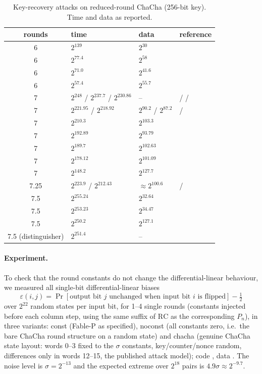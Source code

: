 \documentclass{iacrtrans}
\newcommand{\FableP}{\textsf{Fable-P}\xspace}
\newcommand{\ChaCha}{\textsf{ChaCha}\xspace}
\newcommand{\PP}[1]{P_{#1}}
\begin{document}
\begin{table}[htb]
\centering
\caption{Key-recovery attacks on reduced-round ChaCha (256-bit key). Time and data as reported.}
\label{tab:dllit}
\footnotesize
\begin{tabular}{clll}
\toprule
rounds & time & data & reference\\
\midrule
6 & $2^{139}$ & $2^{30}$ & \cite{AFKMR08}\\
6 & $2^{77.4}$ & $2^{58}$ & \cite{BLT20,BBCDFLNT22}\\
6 & $2^{71.0}$ & $2^{41.6}$ & \cite{Dey24}\\
6 & $2^{57.4}$ & $2^{55.7}$ & \cite{FT25}\\
7 & $2^{248}$ / $2^{237.7}$ / $2^{230.86}$ & -- & \cite{AFKMR08} / \cite{CM16} / \cite{BLT20}\\
7 & $2^{221.95}$ / $2^{218.92}$ & $2^{90.2}$ / $2^{87.2}$ & \cite{DGSS22} / \cite{DGSS23}\\
7 & $2^{210.3}$ & $2^{103.3}$ & \cite{WLHL23}\\
7 & $2^{192.89}$ & $2^{93.79}$ & \cite{Dey24}\\
7 & $2^{189.7}$ & $2^{102.63}$ & \cite{XXTQ24}\\
7 & $2^{178.12}$ & $2^{101.09}$ & \cite{SDSM25}\\
7 & $2^{148.2}$ & $2^{127.7}$ & \cite{FT25}\\
7.25 & $2^{223.9}$ / $2^{212.43}$ & $\approx 2^{100.6}$ & \cite{XXTQ24} / \cite{SDSM25}\\
7.5 & $2^{255.24}$ & $2^{32.64}$ & \cite{Dey24}\\
7.5 & $2^{253.23}$ & $2^{34.47}$ & \cite{SDSM25}\\
7.5 & $2^{250.2}$ & $2^{127.1}$ & \cite{FT25}\\
7.5 (distinguisher) & $2^{251.4}$ & -- & \cite{FT25b}\\
\bottomrule
\end{tabular}
\end{table}

\paragraph{Experiment.} To check that the round constants do not change the differential-linear behaviour, we measured all single-bit differential-linear biases
\[
\varepsilon(i,j) = \Pr[\text{output bit } j \text{ unchanged when input bit } i \text{ is flipped}] - \tfrac12
\]
over $2^{22}$ random states per input bit, for 1--4 single rounds (constants injected before each column step, using the same suffix of $\mathrm{RC}$ as the corresponding $\PP{n}$), in three variants: \textsf{const} (\FableP as specified), \textsf{noconst} (all constants zero, i.e.\ the bare \ChaCha round structure on a random state) and \textsf{chacha} (genuine \ChaCha state layout: words 0--3 fixed to the $\sigma$ constants, key/counter/nonce random, differences only in words 12--15, the published attack model); code , data . The noise level is $\sigma = 2^{-13}$ and the expected extreme over $2^{18}$ pairs is $4.9\sigma \approx 2^{-9.7}$.
\end{document}
